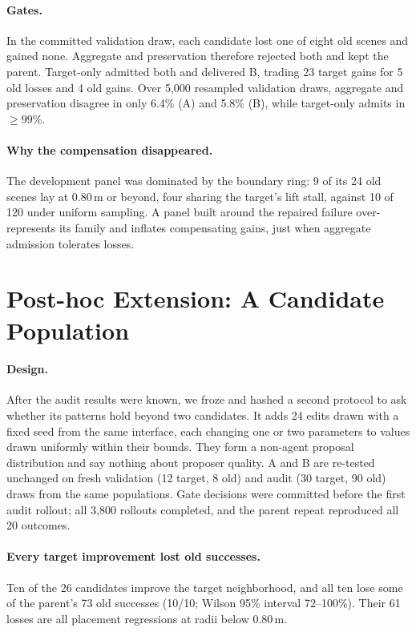 \documentclass[letterpaper]{article} %
\begin{document}
\paragraph{Gates.} In the committed validation draw, each candidate lost one of eight old scenes and gained none. Aggregate and preservation therefore rejected both and kept the parent. Target-only admitted both and delivered B, trading 23 target gains for 5 old losses and 4 old gains. Over 5{,}000 resampled validation draws, aggregate and preservation disagree in only 6.4\% (A) and 5.8\% (B), while target-only admits in ${\ge}99\%$.

\paragraph{Why the compensation disappeared.} The development panel was dominated by the boundary ring: 9 of its 24 old scenes lay at 0.80\,m or beyond, four sharing the target's lift stall, against 10 of 120 under uniform sampling. A panel built around the repaired failure over-represents its family and inflates compensating gains, just when aggregate admission tolerates losses.

\section{Post-hoc Extension: A Candidate Population}
\paragraph{Design.} After the audit results were known, we froze and hashed a second protocol to ask whether its patterns hold beyond two candidates. It adds 24 edits drawn with a fixed seed from the same interface, each changing one or two parameters to values drawn uniformly within their bounds. They form a non-agent proposal distribution and say nothing about proposer quality. A and B are re-tested unchanged on fresh validation (12 target, 8 old) and audit (30 target, 90 old) draws from the same populations. Gate decisions were committed before the first audit rollout; all 3{,}800 rollouts completed, and the parent repeat reproduced all 20 outcomes.



\paragraph{Every target improvement lost old successes.} Ten of the 26 candidates improve the target neighborhood, and all ten lose some of the parent's 73 old successes (10/10; Wilson 95\% interval 72--100\%). Their 61 losses are all placement regressions at radii below 0.80\,m.
\end{document}
